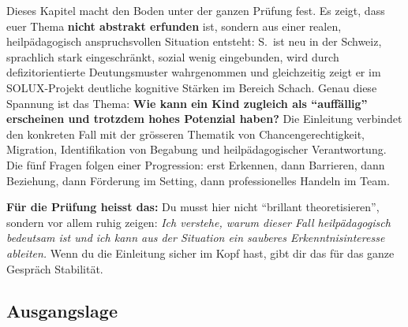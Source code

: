 \documentclass[ngerman, a4paper]{article}
\begin{document}
\begin{kapitelueberblick}
  Dieses Kapitel macht den Boden unter der ganzen Prüfung
  fest. Es zeigt, dass euer Thema \textbf{nicht abstrakt erfunden}
  ist, sondern aus einer realen, heilpädagogisch anspruchsvollen
  Situation entsteht: S.\ ist neu in der Schweiz, sprachlich stark
  eingeschränkt, sozial wenig eingebunden, wird durch
  defizitorientierte Deutungsmuster wahrgenommen und
  gleichzeitig zeigt er im SOLUX-Projekt deutliche kognitive
  Stärken im Bereich Schach. Genau diese Spannung ist das Thema:
  \textbf{Wie kann ein Kind zugleich als \enquote{auffällig}
    erscheinen und trotzdem hohes Potenzial haben?} Die Einleitung
  verbindet den konkreten Fall mit der grösseren Thematik von
  Chancengerechtigkeit, Migration, Identifikation von Begabung
  und heilpädagogischer Verantwortung. Die fünf Fragen folgen einer
  Progression: erst Erkennen, dann Barrieren, dann Beziehung, dann
  Förderung im Setting, dann professionelles Handeln im Team.

  \medskip\textbf{Für die Prüfung heisst das:} Du musst hier
  nicht \enquote{brillant theoretisieren}, sondern vor allem
  ruhig zeigen: \textit{Ich verstehe, warum dieser Fall heilpädagogisch
    bedeutsam ist und ich kann aus der Situation ein sauberes
    Erkenntnisinteresse ableiten.} Wenn du die Einleitung sicher
  im Kopf hast, gibt dir das für das ganze Gespräch Stabilität.
\end{kapitelueberblick}

\subsection*{Ausgangslage}
\end{document}
